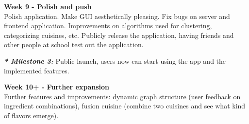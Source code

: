 \textbf{Week 9 - Polish and push} \\
Polish application. Make GUI aesthetically pleasing. Fix bugs on server and frontend application. Improvements on algorithms used for clustering, categorizing cuisines, etc. Publicly release the application, having friends and other people at school test out the application.

{\em \textbf{* Milestone 3:}} Public launch, users now can start using the app and the implemented features.

\textbf{Week 10+ - Further expansion} \\
Further features and improvements: dynamic graph structure (user feedback on ingredient combinations), fusion cuisine (combine two cuisines and see what kind of flavors emerge). 




